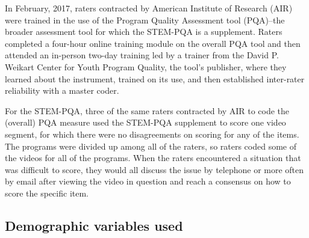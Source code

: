 \documentclass[]{msu-thesis}
\theoremstyle{definition}
\theoremstyle{definition}
\theoremstyle{definition}
\theoremstyle{remark}
\begin{document}
\begin{table}

\caption{\label{tab:unnamed-chunk-6}Coding Frame for Work With Data}
\centering
{}
\end{table}

In February, 2017, raters contracted by American Institute of Research
(AIR) were trained in the use of the Program Quality Assessment tool
(PQA)--the broader assessment tool for which the STEM-PQA is a
supplement. Raters completed a four-hour online training module on the
overall PQA tool and then attended an in-person two-day training led by
a trainer from the David P. Weikart Center for Youth Program Quality,
the tool's publisher, where they learned about the instrument, trained
on its use, and then established inter-rater reliability with a master
coder.

For the STEM-PQA, three of the same raters contracted by AIR to code the
(overall) PQA measure used the STEM-PQA supplement to score one video
segment, for which there were no disagreements on scoring for any of the
items. The programs were divided up among all of the raters, so raters
coded some of the videos for all of the programs. When the raters
encountered a situation that was difficult to score, they would all
discuss the issue by telephone or more often by email after viewing the
video in question and reach a consensus on how to score the specific
item.

\subsection{Demographic variables
used}\label{demographic-variables-used}
\end{document}
